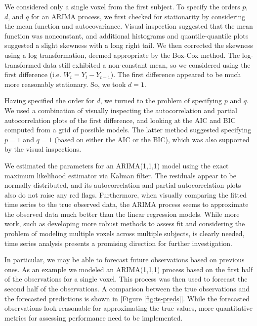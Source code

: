 \par \indent We considered only a single voxel from the first subject. To specify the orders $p$, $d$, and $q$ for an ARIMA process, we first checked for stationarity by considering the mean function and autocovariance. Visual inspection suggested that the mean function was nonconstant, and additional histograms and quantile-quantile plots suggested a slight skewness with a long right tail. We then corrected the skewness using a log transformation, deemed appropriate by the Box-Cox method. The log-transformed data still exhibited a non-constant mean, so we considered using the first difference (i.e. $W_t = Y_t - Y_{t-1}$). The first difference appeared to be much more reasonably stationary. So, we took $d=1$. 
\par Having specified the order for $d$, we turned to the problem of specifying $p$ and $q$. We used a combination of visually inspecting the autocorrelation and partial autocorrelation plots of the first difference, and looking at the AIC and BIC computed from a grid of possible models. The latter method suggested specifying $p=1$ and $q=1$ (based on either the AIC or the BIC), which was also supported by the visual inspections. 
\par We estimated the parameters for an ARIMA(1,1,1) model using the exact maximum likelihood estimator via Kalman filter. The residuals appear to be normally distributed, and its autocorrelation and partial autocorrelation plots also do not raise any red flags. Furthermore, when visually comparing the fitted time series to the true observed data, the ARIMA process seems to approximate the observed data much better than the linear regression models. While more work, such as developing more robust methods to assess fit and considering the problem of modeling multiple voxels across multiple subjects, is clearly needed, time series analysis presents a promising direction for further investigation. 
\par In particular, we may be able to forecast future observations based on previous ones. As an example we modeled an ARIMA(1,1,1) process based on the first half of the observations for a single voxel. This process was then used to forecast the second half of the observations. A comparison between the true observations and the forecasted predictions is shown in [Figure \ref{fig:ts-preds}]. While the forecasted observations look reasonable for approximating the true values, more quantitative metrics for assessing performance need to be implemented. 
